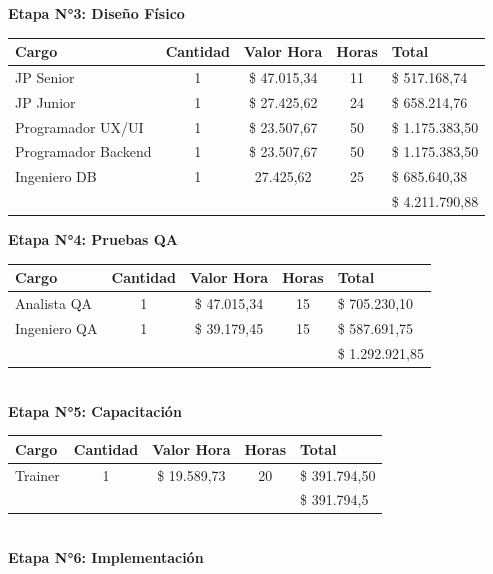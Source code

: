 \documentclass[12pt]{article}
\begin{document}
\textbf{Etapa N°3: Diseño Físico}
\begin{table}[!h]
    \centering
    \begin{tabular}{|p{4cm}|c|c|c|p{3cm}|}
         \hline
         Cargo & Cantidad & Valor Hora & Horas & Total\\
         \hline
         JP Senior & 1 & \$ 47.015,34 & 11 & \$ 517.168,74 \\
         JP Junior & 1 & \$ 27.425,62 & 24 & \$ 658.214,76 \\
         Programador UX/UI & 1 & \$ 23.507,67 & 50 & \$ 1.175.383,50\\
         Programador Backend & 1 & \$ 23.507,67 & 50 & \$ 1.175.383,50\\
         Ingeniero DB & 1 & 27.425,62 & 25 & \$ 685.640,38 \\
         \hline
         & & & & \$ 4.211.790,88\\
         \hline
    \end{tabular}
\end{table}
\newpage
\textbf{Etapa N°4: Pruebas QA}
\begin{table}[!h]
    \centering
    \begin{tabular}{|p{4cm}|c|c|c|p{3cm}|}
         \hline
         Cargo & Cantidad & Valor Hora & Horas & Total\\
         \hline
         Analista QA & 1 & \$ 47.015,34 & 15 & \$ 705.230,10 \\
         Ingeniero QA & 1 & \$ 39.179,45 & 15 & \$ 587.691,75 \\
         \hline
         & & & & \$ 1.292.921,85\\
         \hline
    \end{tabular}
\end{table}
\\
\textbf{Etapa N°5: Capacitación}
\begin{table}[!h]
    \centering
    \begin{tabular}{|p{4cm}|c|c|c|p{3cm}|}
         \hline
         Cargo & Cantidad & Valor Hora & Horas & Total\\
         \hline
         Trainer & 1 & \$ 19.589,73 & 20 & \$ 391.794,50 \\
         \hline
         & & & & \$ 391.794,5\\
         \hline
    \end{tabular}
\end{table}
\\
\textbf{Etapa N°6: Implementación}
\end{document}
